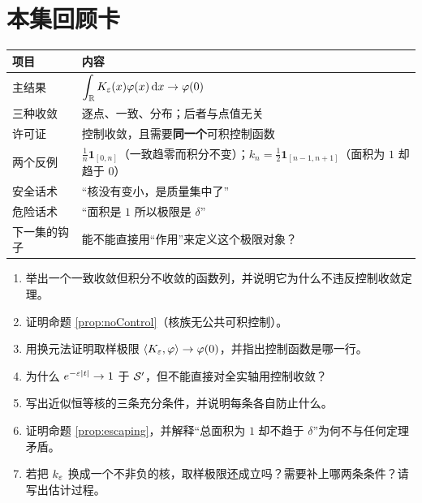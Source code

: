 \section{本集回顾卡}

\begin{center}
\small
\renewcommand{\arraystretch}{1.4}
\begin{tabularx}{\textwidth}{@{}L{3.4cm}Y@{}}
\toprule
项目 & 内容 \\
\midrule
主结果 & $\displaystyle\int_{\mathbb{R}}K_\varepsilon(x)\varphi(x)\mathop{}\!\mathrm{d} x\to\varphi(0)$ \\
三种收敛 & 逐点、一致、分布；后者与点值无关 \\
许可证 & 控制收敛，且需要\textbf{同一个}可积控制函数 \\
两个反例 & $\frac1n\mathbf{1}_{[0,n]}$（一致趋零而积分不变）；$k_n=\frac12\mathbf{1}_{[n-1,n+1]}$（面积为 $1$ 却趋于 $0$）\\
安全话术 & “核没有变小，是质量集中了” \\
危险话术 & “面积是 $1$ 所以极限是 $\delta$” \\
下一集的钩子 & 能不能直接用“作用”来定义这个极限对象？ \\
\bottomrule
\end{tabularx}
\end{center}

\begin{quizbox}[EP04 自测]
\begin{enumerate}[leftmargin=1.6em,itemsep=0.35em]
\item 举出一个一致收敛但积分不收敛的函数列，并说明它为什么不违反控制收敛定理。
\item 证明命题 \ref{prop:noControl}（核族无公共可积控制）。
\item 用换元法证明取样极限 $\langle K_\varepsilon,\varphi\rangle\to\varphi(0)$，并指出控制函数是哪一行。
\item 为什么 $e^{-\varepsilon|t|}\to1$ 于 $\mathcal{S}'$，但不能直接对全实轴用控制收敛？
\item 写出近似恒等核的三条充分条件，并说明每条各自防止什么。
\item 证明命题 \ref{prop:escaping}，并解释“总面积为 $1$ 却不趋于 $\delta$”为何不与任何定理矛盾。
\item 若把 $k_\varepsilon$ 换成一个不非负的核，取样极限还成立吗？需要补上哪两条条件？请写出估计过程。
\end{enumerate}
\end{quizbox}
